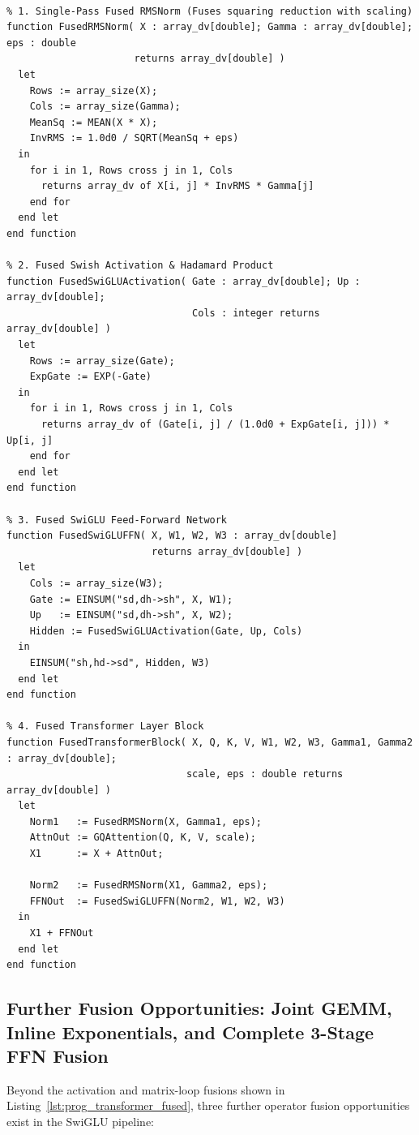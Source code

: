 \begin{lstlisting}[caption={Hand-Optimized Fused Transformer Layer in Sisal-2026 (\texttt{transformer\_fused.sis})},label={lst:prog_transformer_fused}]
% Hand-Optimized Operator Fusion for Transformer Block

% 1. Single-Pass Fused RMSNorm (Fuses squaring reduction with scaling)
function FusedRMSNorm( X : array_dv[double]; Gamma : array_dv[double]; eps : double 
                      returns array_dv[double] )
  let
    Rows := array_size(X);
    Cols := array_size(Gamma);
    MeanSq := MEAN(X * X);
    InvRMS := 1.0d0 / SQRT(MeanSq + eps)
  in
    for i in 1, Rows cross j in 1, Cols
      returns array_dv of X[i, j] * InvRMS * Gamma[j]
    end for
  end let
end function

% 2. Fused Swish Activation & Hadamard Product
function FusedSwiGLUActivation( Gate : array_dv[double]; Up : array_dv[double]; 
                                Cols : integer returns array_dv[double] )
  let
    Rows := array_size(Gate);
    ExpGate := EXP(-Gate)
  in
    for i in 1, Rows cross j in 1, Cols
      returns array_dv of (Gate[i, j] / (1.0d0 + ExpGate[i, j])) * Up[i, j]
    end for
  end let
end function

% 3. Fused SwiGLU Feed-Forward Network
function FusedSwiGLUFFN( X, W1, W2, W3 : array_dv[double] 
                         returns array_dv[double] )
  let
    Cols := array_size(W3);
    Gate := EINSUM("sd,dh->sh", X, W1);
    Up   := EINSUM("sd,dh->sh", X, W2);
    Hidden := FusedSwiGLUActivation(Gate, Up, Cols)
  in
    EINSUM("sh,hd->sd", Hidden, W3)
  end let
end function

% 4. Fused Transformer Layer Block
function FusedTransformerBlock( X, Q, K, V, W1, W2, W3, Gamma1, Gamma2 : array_dv[double]; 
                               scale, eps : double returns array_dv[double] )
  let
    Norm1   := FusedRMSNorm(X, Gamma1, eps);
    AttnOut := GQAttention(Q, K, V, scale);
    X1      := X + AttnOut;
    
    Norm2   := FusedRMSNorm(X1, Gamma2, eps);
    FFNOut  := FusedSwiGLUFFN(Norm2, W1, W2, W3)
  in
    X1 + FFNOut
  end let
end function
\end{lstlisting}

\subsection{Further Fusion Opportunities: Joint GEMM, Inline Exponentials, and Complete 3-Stage FFN Fusion}
Beyond the activation and matrix-loop fusions shown in Listing~\ref{lst:prog_transformer_fused}, three further operator fusion opportunities exist in the SwiGLU pipeline:

